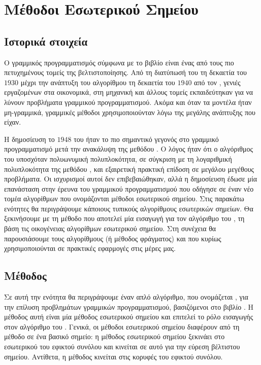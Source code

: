 \chapter{Μέθοδοι Εσωτερικού Σημείου}\label{ch:ip}
\section{Ιστορικά στοιχεία}
Ο γραμμικός προγραμματισμός σύμφωνα με το βιβλίο \cite{wright1997primal}
είναι ένας από τους πιο πετυχημένους τομείς της
βελτιστοποίησης. Από τη διατύπωσή του τη δεκαετία του \(1930\) μέχρι την
ανάπτυξη του αλγορίθμου  τη δεκαετία του \(1940\) από τον
, γενιές εργαζομένων στα οικονομικά, στη μηχανική και άλλους τομείς
εκπαιδεύτηκαν για να λύνουν προβλήματα γραμμικού προγραμματισμού. Ακόμα και όταν
τα μοντέλα ήταν μη-γραμμικά, γραμμικές μέθοδοι χρησιμοποιούνταν λόγω της μεγάλης
ανάπτυξης που είχαν.

Η δημοσίευση το \(1948\) του  \cite{karmarkar1984} ήταν το πιο σημαντικό γεγονός στο
γραμμικό προγραμματισμό μετά την ανακάλυψη της μεθόδου . Ο λόγος
ήταν ότι ο αλγόριθμος του  υποσχόταν πολυωνυμική πολυπλοκότητα, σε
σύγκριση με τη λογαριθμική πολυπλοκότητα της μεθόδου , και
εξαιρετική πρακτική επίδοση σε μεγάλου μεγέθους προβλήματα. Οι ισχυρισμοί αυτοί
δεν επιβεβαιώθηκαν, αλλά η δημοσίευση έδωσε μία επανάσταση στην έρευνα του
γραμμικού προγραμματισμού που οδήγησε σε έναν νέο τομέα αλγορίθμων που
ονομάζονται μέθοδοι εσωτερικού σημείου. Στις παρακάτω ενότητες θα περιγράψουμε
κάποιους τυπικούς αλγορίθμους εσωτερικών σημείων. Θα ξεκινήσουμε με τη μέθοδο
 που αποτελεί μία εισαγωγή για τον αλγόριθμο του
, τη βάση τις οικογένειας αλγορίθμων εσωτερικού σημείου. Στη
συνέχεια θα παρουσιάσουμε τους αλγορίθμους  (ή μέθοδος
φράγματος) και  που κυρίως χρησιμοποιούνται σε πρακτικές
εφαρμογές στις μέρες μας.

\section{Μέθοδος }
Σε αυτή την ενότητα θα περιγράψουμε έναν απλό αλγόριθμο, που ονομάζεται
, για την επίλυση προβλημάτων γραμμικών προγραμματισμού,
βασιζόμενοι στο βιβλίο \cite{chong2010}. Η μέθοδος αυτή είναι μία μέθοδος
εσωτερικού σημείου και επιτελεί το ρόλο εισαγωγής στον αλγόριθμο του
. Γενικά, οι μέθοδοι εσωτερικού σημείου διαφέρουν από τη μέθοδο
 σε ένα βασικό σημείο: η μέθοδος εσωτερικού σημείου ξεκινάει στο
εσωτερικού του εφικτού συνόλου και κινείται σε αυτό για την εύρεση βέλτιστου
σημείου. Αντίθετα, η μέθοδος  κινείται στις κορυφές του εφικτού
συνόλου.

